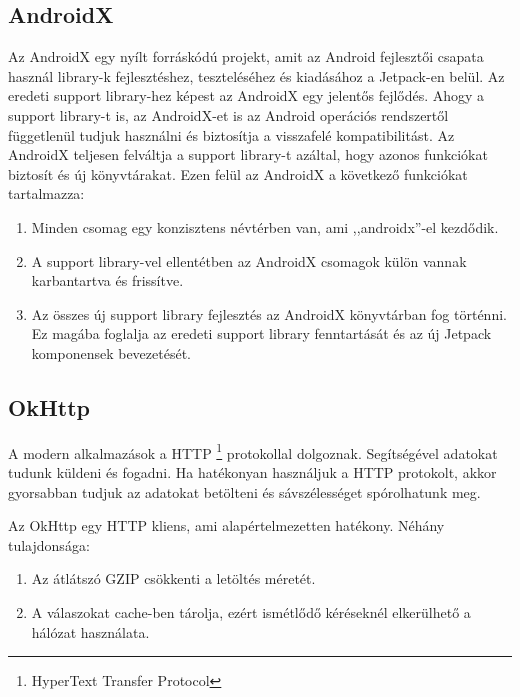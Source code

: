 \documentclass{thesis-ekf}
\theoremstyle{definition}
\theoremstyle{remark}
\begin{document}
\subsection{AndroidX}

Az AndroidX egy nyílt forráskódú projekt, amit az Android fejlesztői csapata használ library-k fejlesztéshez, teszteléséhez és kiadásához a Jetpack-en belül.
Az eredeti support library-hez képest az AndroidX egy jelentős fejlődés. Ahogy a support library-t is, az AndroidX-et is az Android operációs rendszertől függetlenül tudjuk használni és biztosítja a visszafelé kompatibilitást.
Az AndroidX teljesen felváltja a support library-t azáltal, hogy azonos funkciókat biztosít és új könyvtárakat.
Ezen felül az AndroidX a következő funkciókat tartalmazza:

\begin{enumerate}
	\item Minden csomag egy konzisztens névtérben van, ami ,,androidx''-el kezdődik.
	\item A support library-vel ellentétben az AndroidX csomagok külön vannak karbantartva és frissítve.
	\item Az összes új support library fejlesztés az AndroidX könyvtárban fog történni. Ez magába foglalja az eredeti support library fenntartását és az új Jetpack komponensek bevezetését.
\end{enumerate}


\subsection{OkHttp}

A modern alkalmazások a HTTP \footnote{HyperText Transfer Protocol} protokollal dolgoznak. 
Segítségével adatokat tudunk küldeni és fogadni.
Ha hatékonyan használjuk a HTTP protokolt, akkor gyorsabban tudjuk az adatokat betölteni és sávszélességet spórolhatunk meg. 

Az OkHttp egy HTTP kliens, ami alapértelmezetten hatékony. Néhány tulajdonsága:

\begin{enumerate}
	\item Az átlátszó GZIP csökkenti a letöltés méretét.
	\item A válaszokat cache-ben tárolja, ezért ismétlődő kéréseknél elkerülhető a hálózat használata.
	
\end{enumerate}
\end{document}
